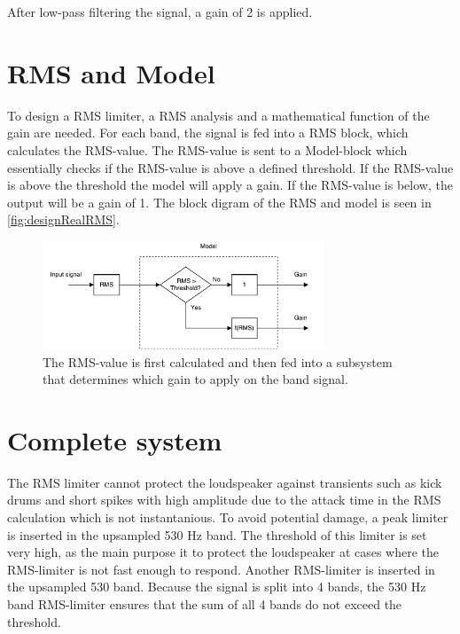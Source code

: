 After low-pass filtering the signal, a gain of 2 is applied.


\section{RMS and Model}

To design a RMS limiter, a RMS analysis and a mathematical function of the gain are needed. For each band, the signal is fed into a RMS block, which calculates the RMS-value. The RMS-value is sent to a Model-block which essentially checks if the RMS-value is above a defined threshold. If the RMS-value is above the threshold the model will apply a gain. If the RMS-value is below, the output will be a gain of 1. The block digram of the RMS and model is seen in \autoref{fig:designRealRMS}.

\begin{figure}[H]
\centering
\includegraphics[width=0.75\textwidth]{figures/designRealRMS.pdf}
\caption{The RMS-value is first calculated and then fed into a subsystem that determines which gain to apply on the band signal.}
\label{fig:designRealRMS}
\end{figure}




\section{Complete system}

The RMS limiter cannot protect the loudspeaker against transients such as kick drums and short spikes with high amplitude due to the attack time in the RMS calculation which is not instantanious. To avoid potential damage, a peak limiter is inserted in the upsampled 530 Hz band. The threshold of this limiter is set very high, as the main purpose it to protect the loudspeaker at cases where the RMS-limiter is not fast enough to respond. Another RMS-limiter is inserted in the upsampled 530 band. Because the signal is split into 4 bands, the 530 Hz band RMS-limiter ensures that the sum of all 4 bands do not exceed the threshold.

